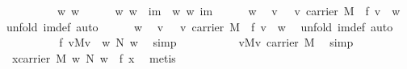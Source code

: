 \begin{isabellebody}
\ \ \isamarkupfalse%
\ {\isacharminus}\isanewline
\ \ \ \ \isamarkupfalse%
\ w{}\ w{}\isanewline
\ \ \ \ \isamarkupfalse%
\ w{}{\isacharcolon}\ {\isachardoublequoteopen}w{}\ {\isasymin}\ im{\isachardoublequoteclose}\ \ w{}{\isacharcolon}\ {\isachardoublequoteopen}w{}{\isasymin}\ im{\isachardoublequoteclose}\isanewline
\ \ \ \ \isamarkupfalse%
\ w{}\ \isamarkupfalse%
\ v{}\ \ {}{\isacharcolon}\ {\isachardoublequoteopen}v{}{\isasymin}\ carrier\ M\ {\isasymand}\ f\ v{}\ {\isacharequal}\ w{}{\isachardoublequoteclose}\ \isamarkupfalse%
\ {\isacharparenleft}unfold\ im{\isacharunderscore}def{\isacharcomma}\ auto{\isacharparenright}\isanewline
\ \ \ \ \isamarkupfalse%
\ w{}\ \isamarkupfalse%
\ v{}\ \ {}{\isacharcolon}\ {\isachardoublequoteopen}v{}{\isasymin}\ carrier\ M\ {\isasymand}\ f\ v{}\ {\isacharequal}\ w{}{\isachardoublequoteclose}\ \isamarkupfalse%
\ {\isacharparenleft}unfold\ im{\isacharunderscore}def{\isacharcomma}\ auto{\isacharparenright}\isanewline
\ \ \ \ \isamarkupfalse%
\ {}\ {}\ \isamarkupfalse%
\ {}{\isacharcolon}\ {\isachardoublequoteopen}f\ {\isacharparenleft}v{}{\isasymoplus}\isactrlbsub M\isactrlesub v{}{\isacharparenright}\ {\isacharequal}\ w{}\ {\isasymoplus}\isactrlbsub N\isactrlesub \ w{}{\isachardoublequoteclose}\ \isamarkupfalse%
\ simp\isanewline
\ \ \ \ \isamarkupfalse%
\ {}\ {}\ \isamarkupfalse%
\ {}{\isacharcolon}\ {\isachardoublequoteopen}v{}{\isasymoplus}\isactrlbsub M\isactrlesub v{}{\isasymin}\ carrier\ M{\isachardoublequoteclose}\ \isamarkupfalse%
\ simp\isanewline
\ \ \ \ \isamarkupfalse%
\ {}\ {}\ \isamarkupfalse%
\ {}{\isacharcolon}\ {\isachardoublequoteopen}{\isasymexists}x{\isasymin}carrier\ M{\isachardot}\ w{}\ {\isasymoplus}\isactrlbsub N\isactrlesub \ w{}\ {\isacharequal}\ f\ x{\isachardoublequoteclose}\ \isamarkupfalse%
\ metis\isanewline
\ \ \ \ \isamarkupfalse%

\end{isabellebody}

